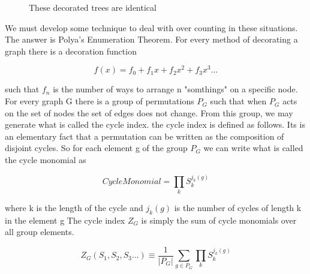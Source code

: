 \documentclass{article}
\begin{document}
\begin{figure}[!h]
\centering
{}
\caption{These decorated trees are identical}
\end{figure}

We must develop some technique to deal with over counting in these situations. The answer is Polya's Enumeration Theorem. 
For every method of decorating a graph there is a decoration function 

 \begin{equation}
f(x)=f_0+f_1x+f_2x^2+f_3x^3...
\end{equation}

such that \(f_n\) is the number of ways to arrange n "somthings" on a specific node.
For every graph G there is a group of permutations \(P_G\) such that when \(P_G\) acts on the set of nodes the set of edges does not change. From this group, we may generate what is called the cycle index. the cycle index is defined as follows. Its is an elementary fact that a permutation can be written as the composition of disjoint cycles. So for each element g of the group \(P_G\) we can write what is called the cycle monomial as 

\begin{equation}
Cycle Monomial=\prod_k S_k^{j_k(g)}
\end{equation}

where k is the length of the cycle and \(j_k(g)\) is the number of cycles of length k in the element g
The cycle index \(Z_G\) is simply the sum of cycle monomials over all group elements.
 
\begin{equation}
Z_G(S_1,S_2,S_3...) \equiv \frac{1}{|P_G|}\sum_{g\in P_G} \prod_k S_k^{j_k(g)}
\end{equation}
\end{document}
